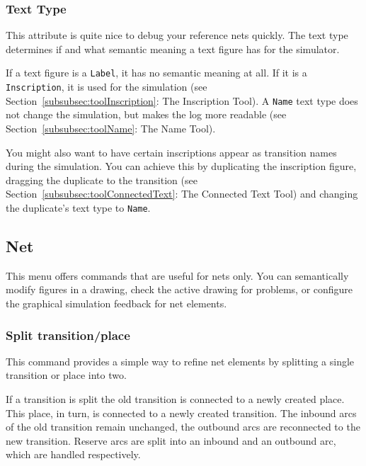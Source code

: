 \subsubsection{Text Type}

This attribute is quite nice to debug your reference nets quickly.
The text type determines if and what semantic meaning a text
figure has for the simulator.

If a text figure is a \texttt{Label}, it has no semantic meaning at
all. If it is a \texttt{Inscription}, it is used for the simulation
(see Section~\ref{subsubsec:toolInscription}: The Inscription Tool).
A \texttt{Name} text type does not change the simulation, but makes
the log more readable (see Section~\ref{subsubsec:toolName}: The Name Tool).


You might also want to have certain inscriptions appear as transition
names during the simulation. You can achieve this by duplicating the
inscription figure, dragging the duplicate to the transition (see
Section~\ref{subsubsec:toolConnectedText}: The Connected Text Tool)
and changing the duplicate's text type to \texttt{Name}.


\subsection{Net}
\label{sec:net-menu}
This menu offers commands that are useful for nets only.
You can semantically modify figures in a drawing, check
the active drawing for problems, or configure the
graphical simulation feedback for net elements.

\subsubsection{Split transition/place}
This command provides a simple way to refine net
elements by splitting a single transition or place into two.

If a transition is split the old transition is connected to a
newly created place. This place, in turn, is connected to a
newly created transition. The inbound arcs of the old
transition remain unchanged, the outbound arcs are reconnected
to the new transition. Reserve arcs are split into an inbound
and an outbound arc, which are handled respectively.

